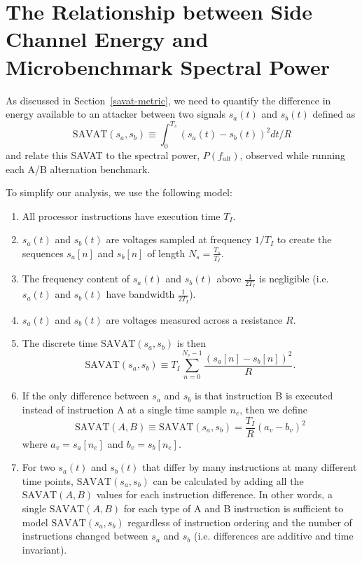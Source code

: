 \chapter{The Relationship between Side Channel Energy and Microbenchmark Spectral Power}

As discussed in Section~\ref{savat-metric}, we need to quantify the difference in energy available to an attacker between two signals $s_a(t)$ and $s_b(t)$ defined as
\begin{equation}
  \textrm{SAVAT}(s_a,s_b) \equiv \int_{0}^{T_s} (s_a(t) - s_b(t))^2 dt/R
\end{equation}
and relate this SAVAT to the spectral power, $P(f_{alt})$, observed while running each A/B alternation benchmark.

To simplify our analysis, we use the following model:
\begin{enumerate}
\item All processor instructions have execution time $T_I$.
\item $s_a(t)$ and $s_b(t)$ are voltages sampled at frequency $1/T_I$ to create the sequences $s_a[n]$ and $s_b[n]$ of length \hbox{$N_s = \frac{T_s}{T_I}$}.
\item The frequency content of $s_a(t)$ and $s_b(t)$ above $\frac{1}{2T_I}$ is negligible (i.e. $s_a(t)$ and $s_b(t)$ have bandwidth $\frac{1}{2T_I}$).
\item $s_a(t)$ and $s_b(t)$ are voltages measured across a resistance $R$.
\item The discrete time $\textrm{SAVAT}(s_a,s_b)$ is then
  \begin{equation}
    \textrm{SAVAT}(s_a,s_b) \equiv T_I \sum_{n=0}^{N_s-1} \frac{(s_a[n]-s_b[n])^2}{R}.
  \end{equation}
\item If the only difference between $s_a$ and $s_b$ is that instruction B is executed instead of instruction A at a single time sample $n_e$, then we define
  \begin{equation}
    \label{eqn:discrete_ese}
    \textrm{SAVAT}(A,B) \equiv \textrm{SAVAT}(s_a,s_b) = \frac{T_I}{R} (a_v - b_v)^2
  \end{equation}
  where $a_v = s_a[n_e]$ and $b_v = s_b[n_e]$.
\item For two $s_a(t)$ and $s_b(t)$ that differ by many instructions at many different time points, $\textrm{SAVAT}(s_a,s_b)$ can be calculated by adding all the $\textrm{SAVAT}(A,B)$ values for each instruction difference. In other words, a single $\textrm{SAVAT}(A,B)$ for each type of A and B instruction is sufficient to model $\textrm{SAVAT}(s_a,s_b)$ regardless of instruction ordering and the number of instructions changed between $s_a$ and $s_b$ (i.e. differences are additive and time invariant). 
\end{enumerate}


